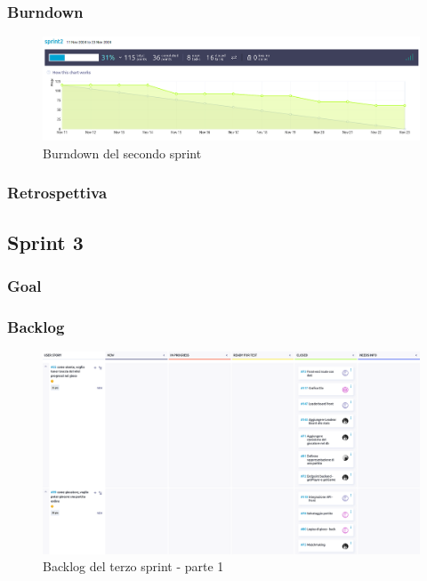 \documentclass{article}
\begin{document}
\subsubsection{Burndown}
\begin{figure}[H]
    \centering
    \includegraphics[width=1\textwidth]{burndown2}
    \caption{Burndown del secondo sprint}
    \label{fig:burndown2}
\end{figure}

\subsubsection{Retrospettiva}

\subsection{Sprint 3}

\subsubsection{Goal}

\subsubsection{Backlog}
\begin{figure}[H]
    \centering
    \includegraphics[width=1\textwidth]{backlog3_1}
    \caption{Backlog del terzo sprint - parte 1}
    \label{fig:backlog3_1}
\end{figure}
\end{document}
